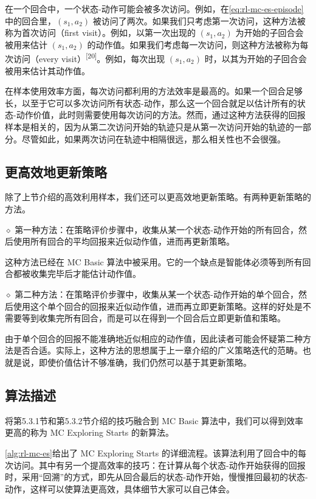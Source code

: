 在一个回合中，一个状态-动作可能会被多次访问。例如，在\cref{eq:rl-mc-es-episode}中的回合里，$(s_1, a_2)$ 被访问了两次。如果我们只考虑第一次访问，这种方法被称为首次访问（first visit）。例如，以第一次出现的 $(s_1, a_2)$ 为开始的子回合会被用来估计 $(s_1, a_2)$ 的动作值。如果我们考虑每一次访问，则这种方法被称为每次访问（every visit）\textsuperscript{[20]}。例如，每次出现 $(s_1, a_2)$ 时，以其为开始的子回合会被用来估计其动作值。

在样本使用效率方面，每次访问都利用的方法效率是最高的。如果一个回合足够长，以至于它可以多次访问所有状态-动作，那么这一个回合就足以估计所有的状态-动作价值，此时则需要使用每次访问的方法。然而，通过这种方法获得的回报样本是相关的，因为从第二次访问开始的轨迹只是从第一次访问开始的轨迹的一部分。尽管如此，如果两次访问在轨迹中相隔很远，那么相关性也不会很强。

\subsection{更高效地更新策略}
\label{sec:rl-mc-es-update}

除了上节介绍的高效利用样本，我们还可以更高效地更新策略。有两种更新策略的方法。

$\diamond$ 第一种方法：在策略评价步骤中，收集从某一个状态-动作开始的所有回合，然后使用所有回合的平均回报来近似动作值，进而再更新策略。

这种方法已经在 MC Basic 算法中被采用。它的一个缺点是智能体必须等到所有回合都被收集完毕后才能估计动作值。

$\diamond$ 第二种方法：在策略评价步骤中，收集从某一个状态-动作开始的单个回合，然后使用这个单个回合的回报来近似动作值，进而再立即更新策略。这样的好处是不需要等到收集完所有回合，而是可以在得到一个回合后立即更新值和策略。

由于单个回合的回报不能准确地近似相应的动作值，因此读者可能会怀疑第二种方法是否合适。实际上，这种方法的思想属于上一章介绍的广义策略迭代的范畴。也就是说，即使价值估计不够准确，我们仍然可以基于其更新策略。

\subsection{算法描述}
\label{sec:rl-mc-es-algorithm}

将第5.3.1节和第5.3.2节介绍的技巧融合到 MC Basic 算法中，我们可以得到效率更高的称为 MC Exploring Starts 的新算法。

\cref{alg:rl-mc-es}给出了 MC Exploring Starts 的详细流程。该算法利用了回合中的每次访问。其中有另一个提高效率的技巧：在计算从每个状态-动作开始获得的回报时，采用“回溯”的方式，即先从回合最后的状态-动作开始，慢慢推回最初的状态-动作，这样可以使算法更高效，具体细节大家可以自己体会。

